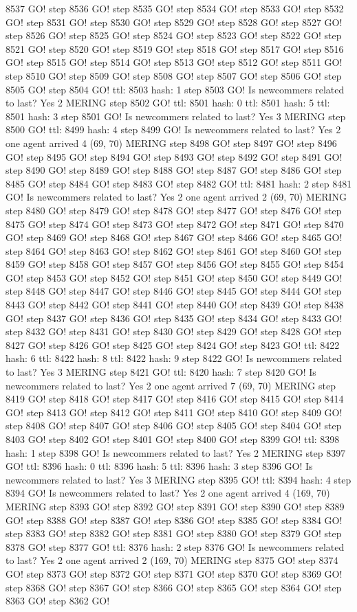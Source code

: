 8537 GO! step 8536 GO! step 8535 GO! step 8534 GO! step 8533 GO! step 8532 GO! step 8531 GO! step 8530 GO! step 8529 GO! step 8528 GO! step 8527 GO! step 8526 GO! step 8525 GO! step 8524 GO! step 8523 GO! step 8522 GO! step 8521 GO! step 8520 GO! step 8519 GO! step 8518 GO! step 8517 GO! step 8516 GO! step 8515 GO! step 8514 GO! step 8513 GO! step 8512 GO! step 8511 GO! step 8510 GO! step 8509 GO! step 8508 GO! step 8507 GO! step 8506 GO! step 8505 GO! step 8504 GO! ttl: 8503 hash: 1 step 8503 GO! Is newcommers related to last? Yes 2 MERING step 8502 GO! ttl: 8501 hash: 0 ttl: 8501 hash: 5 ttl: 8501 hash: 3 step 8501 GO! Is newcommers related to last? Yes 3 MERING step 8500 GO! ttl: 8499 hash: 4 step 8499 GO! Is newcommers related to last? Yes 2 one agent arrived 4 (69, 70) MERING step 8498 GO! step 8497 GO! step 8496 GO! step 8495 GO! step 8494 GO! step 8493 GO! step 8492 GO! step 8491 GO! step 8490 GO! step 8489 GO! step 8488 GO! step 8487 GO! step 8486 GO! step 8485 GO! step 8484 GO! step 8483 GO! step 8482 GO! ttl: 8481 hash: 2 step 8481 GO! Is newcommers related to last? Yes 2 one agent arrived 2 (69, 70) MERING step 8480 GO! step 8479 GO! step 8478 GO! step 8477 GO! step 8476 GO! step 8475 GO! step 8474 GO! step 8473 GO! step 8472 GO! step 8471 GO! step 8470 GO! step 8469 GO! step 8468 GO! step 8467 GO! step 8466 GO! step 8465 GO! step 8464 GO! step 8463 GO! step 8462 GO! step 8461 GO! step 8460 GO! step 8459 GO! step 8458 GO! step 8457 GO! step 8456 GO! step 8455 GO! step 8454 GO! step 8453 GO! step 8452 GO! step 8451 GO! step 8450 GO! step 8449 GO! step 8448 GO! step 8447 GO! step 8446 GO! step 8445 GO! step 8444 GO! step 8443 GO! step 8442 GO! step 8441 GO! step 8440 GO! step 8439 GO! step 8438 GO! step 8437 GO! step 8436 GO! step 8435 GO! step 8434 GO! step 8433 GO! step 8432 GO! step 8431 GO! step 8430 GO! step 8429 GO! step 8428 GO! step 8427 GO! step 8426 GO! step 8425 GO! step 8424 GO! step 8423 GO! ttl: 8422 hash: 6 ttl: 8422 hash: 8 ttl: 8422 hash: 9 step 8422 GO! Is newcommers related to last? Yes 3 MERING step 8421 GO! ttl: 8420 hash: 7 step 8420 GO! Is newcommers related to last? Yes 2 one agent arrived 7 (69, 70) MERING step 8419 GO! step 8418 GO! step 8417 GO! step 8416 GO! step 8415 GO! step 8414 GO! step 8413 GO! step 8412 GO! step 8411 GO! step 8410 GO! step 8409 GO! step 8408 GO! step 8407 GO! step 8406 GO! step 8405 GO! step 8404 GO! step 8403 GO! step 8402 GO! step 8401 GO! step 8400 GO! step 8399 GO! ttl: 8398 hash: 1 step 8398 GO! Is newcommers related to last? Yes 2 MERING step 8397 GO! ttl: 8396 hash: 0 ttl: 8396 hash: 5 ttl: 8396 hash: 3 step 8396 GO! Is newcommers related to last? Yes 3 MERING step 8395 GO! ttl: 8394 hash: 4 step 8394 GO! Is newcommers related to last? Yes 2 one agent arrived 4 (169, 70) MERING step 8393 GO! step 8392 GO! step 8391 GO! step 8390 GO! step 8389 GO! step 8388 GO! step 8387 GO! step 8386 GO! step 8385 GO! step 8384 GO! step 8383 GO! step 8382 GO! step 8381 GO! step 8380 GO! step 8379 GO! step 8378 GO! step 8377 GO! ttl: 8376 hash: 2 step 8376 GO! Is newcommers related to last? Yes 2 one agent arrived 2 (169, 70) MERING step 8375 GO! step 8374 GO! step 8373 GO! step 8372 GO! step 8371 GO! step 8370 GO! step 8369 GO! step 8368 GO! step 8367 GO! step 8366 GO! step 8365 GO! step 8364 GO! step 8363 GO! step 8362 GO! 